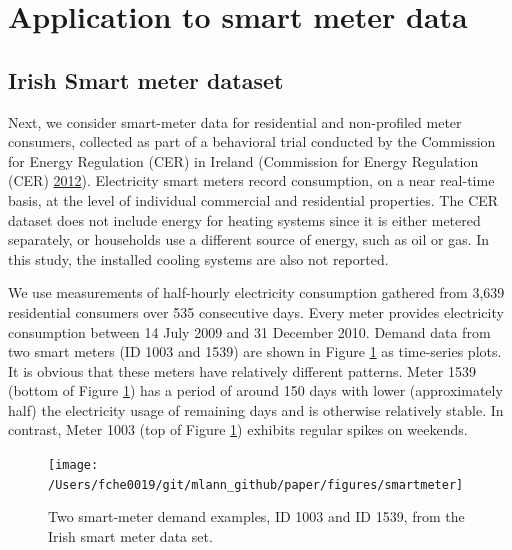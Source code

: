 \documentclass[12pt]{article}
\begin{document}
\hypertarget{smartmeter}{%
\section{Application to smart meter data}\label{smartmeter}}

\hypertarget{irish-smart-meter-dataset}{%
\subsection{Irish Smart meter dataset}\label{irish-smart-meter-dataset}}

Next, we consider smart-meter data for residential and non-profiled meter consumers, collected as part of a behavioral trial conducted by the Commission for Energy Regulation (CER) in Ireland (Commission for Energy Regulation (CER) \protect\hyperlink{ref-cer2012-data}{2012}). Electricity smart meters record consumption, on a near real-time basis, at the level of individual commercial and residential properties. The CER dataset does not include energy for heating systems since it is either metered separately, or households use a different source of energy, such as oil or gas. In this study, the installed cooling systems are also not reported.

We use measurements of half-hourly electricity consumption gathered from 3,639 residential consumers over 535 consecutive days. Every meter provides electricity consumption between 14 July 2009 and 31 December 2010. Demand data from two smart meters (ID 1003 and 1539) are shown in Figure \ref{fig:smartmeter} as time-series plots. It is obvious that these meters have relatively different patterns. Meter 1539 (bottom of Figure \ref{fig:smartmeter}) has a period of around 150 days with lower (approximately half) the electricity usage of remaining days and is otherwise relatively stable. In contrast, Meter 1003 (top of Figure \ref{fig:smartmeter}) exhibits regular spikes on weekends.

\begin{figure}

{\centering \texttt{[image: /Users/fche0019/git/mlann\_github/paper/figures/smartmeter]} 

}

\caption{Two smart-meter demand examples, ID 1003 and ID 1539, from the Irish smart meter data set.}\label{fig:smartmeter}
\end{figure}
\end{document}
